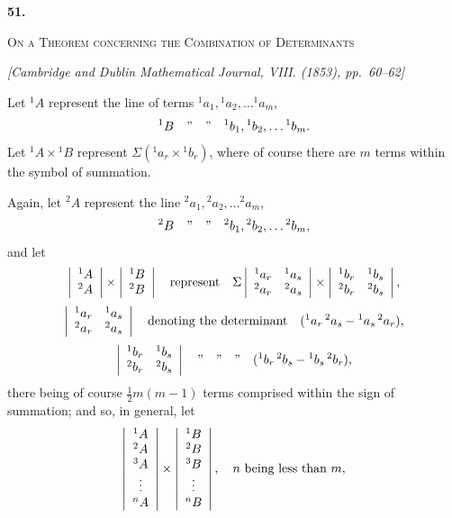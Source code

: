 \documentclass[11pt]{article}
\newcommand{\paperhead}[3]{%
  \clearpage
  \begin{center}
  {\Large\bfseries #1.}\par\vspace{0.85em}
  {\large\scshape #2}\par\vspace{0.6em}
  {\itshape [#3]}\par
  \end{center}\vspace{0.4em}}
\newcommand{\sourcepage}[1]{\marginpar{\scriptsize p.~#1}}
\begin{document}
{{\paperhead{51}{On a Theorem concerning the Combination of Determinants}{Cambridge and Dublin Mathematical Journal, VIII. (1853), pp.~60--62}

\sourcepage{399}
Let ${}^1A$ represent the line of terms ${}^1a_1,{}^1a_2,\ldots{}^1a_m$,
\[
{}^1B\quad\hbox{''}\quad\hbox{''}\quad{}^1b_1,{}^1b_2,\ldots{}^1b_m.
\]
Let ${}^1A\times{}^1B$ represent $\Sigma({}^1a_r\times{}^1b_r)$, where of course there are $m$ terms within the symbol of summation.

Again, let ${}^2A$ represent the line ${}^2a_1,{}^2a_2,\ldots{}^2a_m$,
\[
{}^2B\quad\hbox{''}\quad\hbox{''}\quad{}^2b_1,{}^2b_2,\ldots{}^2b_m,
\]
and let
\[
\left|\begin{array}{c}{}^1A\\{}^2A\end{array}\right|
\times
\left|\begin{array}{c}{}^1B\\{}^2B\end{array}\right|
\quad\hbox{represent}\quad
\Sigma
\left|
\begin{array}{cc}
{}^1a_r&{}^1a_s\\
{}^2a_r&{}^2a_s
\end{array}\right|
\times
\left|
\begin{array}{cc}
{}^1b_r&{}^1b_s\\
{}^2b_r&{}^2b_s
\end{array}\right|,
\]
\[
\left|
\begin{array}{cc}
{}^1a_r&{}^1a_s\\
{}^2a_r&{}^2a_s
\end{array}\right|
\quad\hbox{denoting the determinant}\quad
({}^1a_r\,{}^2a_s-{}^1a_s\,{}^2a_r),
\]
\[
\left|
\begin{array}{cc}
{}^1b_r&{}^1b_s\\
{}^2b_r&{}^2b_s
\end{array}\right|
\quad\hbox{''}\quad\hbox{''}\quad\hbox{''}\quad
({}^1b_r\,{}^2b_s-{}^1b_s\,{}^2b_r),
\]
there being of course $\frac12m(m-1)$ terms comprised within the sign of summation; and so, in general, let
\[
\left|
\begin{array}{c}
{}^1A\\{}^2A\\{}^3A\\ \vdots\\{}^nA
\end{array}\right|
\times
\left|
\begin{array}{c}
{}^1B\\{}^2B\\{}^3B\\ \vdots\\{}^nB
\end{array}\right|,
\quad n\hbox{ being less than }m,
\]

}}
\end{document}
